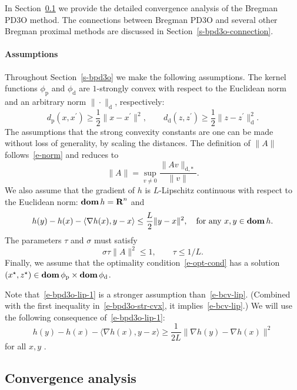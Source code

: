 \documentclass[letterpaper,11pt]{article}
\newcommand{\BEQ}{\begin{equation}}
\newcommand{\EEQ}{\end{equation}}
\newcommand{\dom}{\mathop{\bf dom}}
\newcommand{\inprod}[2]{\langle#1, #2\rangle}
\newcommand{\reals}{{\mbox{\bf R}}}
\newcommand{\primal}{\mathrm p}
\newcommand{\dual}{\mathrm d}
\begin{document}
In Section~\ref{s-bpd3o-conv} we provide the detailed convergence analysis
of the Bregman PD3O method.
The connections between Bregman PD3O and several other Bregman proximal
methods are discussed in Section~\ref{s-bpd3o-connection}.

\paragraph{Assumptions}
Throughout Section~\ref{s-bpd3o} we make the following assumptions.
The kernel functions $\phi_\primal$ and $\phi_\dual$ are 
$1$-strongly convex with respect to the Euclidean norm and
an arbitrary norm $\|\cdot\|_\dual$, respectively:
\begin{equation} \label{e-bpd3o-str-cvx}
d_\primal(x,x^\prime) \geq \frac{1}{2}\|x-x^\prime\|^2, \qquad
d_\dual(z,z^\prime) \geq \frac{1}{2}\|z-z^\prime\|_\dual^2.
\end{equation} 
The assumptions that the strong convexity constants are one can
be made without loss of generality, by scaling the distances.
The definition of $\|A\|$ follows~\eqref{e-norm} and reduces to
\[
\|A\|=\sup_{v\neq 0} \frac{\|Av\|_{\dual,\ast}}{\|v\|}.
\] 
We also assume that the gradient of $h$ is $L$-Lipschitz continuous
with respect to the Euclidean norm: $\dom h = \reals^n$ and
\BEQ \label{e-bpd3o-lip-1}
h(y)-h(x)-\inprod{\nabla h(x)}{y-x} \leq \frac{L}{2}\|y-x\|^2,
\quad \mbox{for any } x,y \in \dom h.
\EEQ
The parameters $\tau$ and $\sigma$ must satisfy
\begin{equation} \label{e-bpd3o-param}
\sigma \tau \|A\|^2 \leq 1, \qquad \tau \leq 1/L.
\end{equation} 
Finally, we assume that the optimality condition~\eqref{e-opt-cond} has a
solution $(x^\star,z^\star) \in \dom \phi_\primal \times \dom \phi_\dual$.

Note that~\eqref{e-bpd3o-lip-1} is a stronger assumption
than~\eqref{e-bcv-lip}.
(Combined with the first inequality in~\eqref{e-bpd3o-str-cvx},
it implies~\eqref{e-bcv-lip}.)
We will use the following consequence of~\eqref{e-bpd3o-lip-1}:
\begin{equation} \label{e-bpd3o-lip-2}
h(y)-h(x)-\inprod{\nabla h(x)}{y-x} 
\geq \frac{1}{2L} \|\nabla h(y)-\nabla h(x)\|^2
\end{equation} 
for all $x,y$ \cite[Theorem 2.1.5]{Nesterov18}.

\subsection{Convergence analysis} \label{s-bpd3o-conv}
\end{document}
